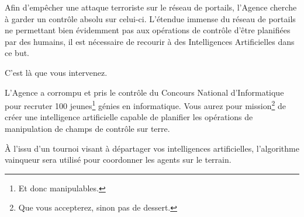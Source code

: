 Afin d'empêcher une attaque terroriste sur le réseau de portails, l'Agence
cherche à garder un contrôle absolu sur celui-ci. L'étendue immense du réseau
de portails ne permettant bien évidemment pas aux opérations de contrôle d'être
planifiées par des humains, il est nécessaire de recourir à des Intelligences
Artificielles dans ce but.

C'est là que vous intervenez.

L'Agence a corrompu et pris le contrôle du Concours National d'Informatique
pour recruter 100 jeunes\footnote{Et donc manipulables.} génies en
informatique. Vous aurez pour mission\footnote{Que vous accepterez, sinon pas
de dessert.\footnotemark} de
créer une intelligence artificielle capable de planifier les opérations de
manipulation de champs de contrôle sur terre.

À l'issu d'un tournoi visant à départager vos intelligences artificielles,
l'algorithme vainqueur sera utilisé pour coordonner les agents sur le terrain.
